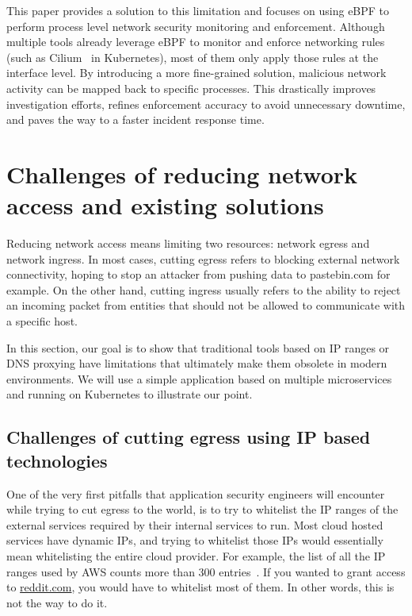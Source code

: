 This paper provides a solution to this limitation and focuses on using eBPF to perform process level network security monitoring and enforcement. Although multiple tools already leverage eBPF to monitor and enforce networking rules (such as Cilium~\cite{ProcessLevelNetworkSecurityMonitoring:Cilium} in Kubernetes), most of them only apply those rules at the interface level. By introducing a more fine-grained solution, malicious network activity can be mapped back to specific processes. This drastically improves investigation efforts, refines enforcement accuracy to avoid unnecessary downtime, and paves the way to a faster incident response time.

\section{Challenges of reducing network access and existing solutions}

Reducing network access means limiting two resources: network egress and network ingress. In most cases, cutting egress refers to blocking external network connectivity, hoping to stop an attacker from pushing data to pastebin.com for example. On the other hand, cutting ingress usually refers to the ability to reject an incoming packet from entities that should not be allowed to communicate with a specific host.

In this section, our goal is to show that traditional tools based on IP ranges or DNS proxying have limitations that ultimately make them obsolete in modern environments. We will use a simple application based on multiple microservices and running on Kubernetes to illustrate our point.

\subsection{Challenges of cutting egress using IP based technologies}

One of the very first pitfalls that application security engineers will encounter while trying to cut egress to the world, is to try to whitelist the IP ranges of the external services required by their internal services to run. Most cloud hosted services have dynamic IPs, and trying to whitelist those IPs would essentially mean whitelisting the entire cloud provider. For example, the list of all the IP ranges used by AWS counts more than 300 entries~\cite{ProcessLevelNetworkSecurityMonitoring:AWS}. If you wanted to grant access to \url{reddit.com}, you would have to whitelist most of them. In other words, this is not the way to do it.


